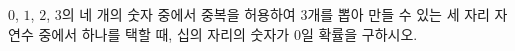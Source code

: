 $0$, $1$, $2$, $3$의 네 개의 숫자 중에서 중복을 허용하여 $3$개를 뽑아 만들 수 있는 세 자리 자연수 중에서 하나를 택할 때, 십의 자리의 숫자가 $0$일 확률을 구하시오.

